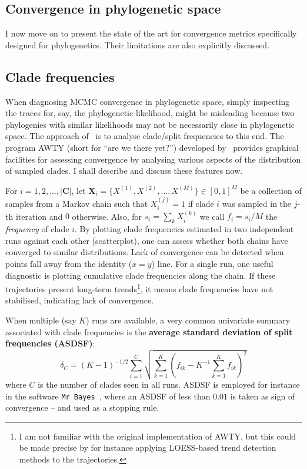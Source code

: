 \subsection{Convergence in phylogenetic space}
\label{sec:treespaceconv}

I now move on to present the state of the art for convergence metrics specifically designed for phylogenetics.
Their limitations are also explicitly discussed.

\subsection{Clade frequencies}
\label{sec:awty}

When diagnosing MCMC convergence in phylogenetic space, simply inspecting the traces for, say, the phylogenetic likelihood, might be misleading because two phylogenies with similar likelihoods may not be necessarily close in phylogenetic space.
The approach of~\cite{Nylander2008} is to analyse clade/split frequencies to this end.
The program AWTY (short for ``are we there yet?'') developed by~\cite{Nylander2008} provides graphical facilities for assessing convergence by analysing various aspects of the distribution of sampled clades.
I shall describe and discuss these features now.

For $ i = 1, 2, \ldots, |\boldsymbol C|$, let $\boldsymbol X_i = \{X^{(1)}, X^{(2)}, \ldots, X^{(M)}\} \in [0, 1]^M$ be a collection of samples from a Markov chain such that $X^{(j)}_i = 1$ if clade $i$ was sampled in the $j$-th iteration and $0$ otherwise.
Also, for $s_i = \sum_k X_i^{(k)}$ we call $f_i = s_i/M$ the \textit{frequency} of clade $i$.
By plotting clade frequencies estimated in two independent runs against each other (scatterplot), one can assess whether both chains have converged to similar distributions.
Lack of convergence can be detected when points fall away from the identity ($x = y$) line.
For a single run, one useful diagnostic is plotting cumulative clade frequencies along the chain.
If these trajectories present long-term trends\footnote{I am not familiar with the original implementation of AWTY, but this could be made precise by for instance applying LOESS-based trend detection methods to the trajectories.}, it means clade frequencies have not stabilised, indicating lack of convergence.

When multiple (say $K$) runs are available, a very common univariate summary associated with clade frequencies is the \textbf{average standard deviation of split frequencies  (ASDSF)}:
\begin{equation}
 \label{eq:ASDSF}
 \delta_C = (K-1)^{-1/2}\sum_{i = 1}^{C}\sqrt{\sum_{k=1}^K\left(f_{ik} - K^{-1}\sum_{k = 1}^K f_{ik}\right)^2}
\end{equation}
where $C$ is the number of clades seen in all runs.
ASDSF is employed for instance in the software \verb|Mr Bayes|~\citep{Huelsenbeck2001a}, where an ASDSF of less than $0.01$ is taken as sign of convergence -- and used as a stopping rule.

